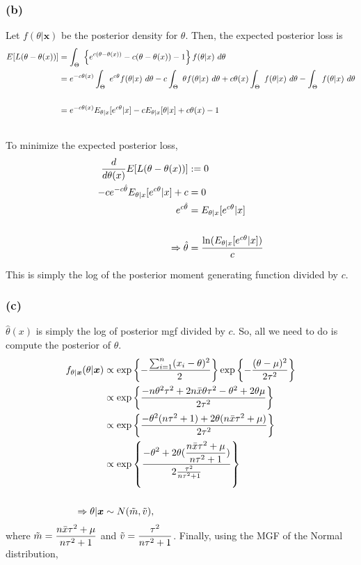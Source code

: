 \subsubsection*{(b)}
\def\mgf{E_{\theta|x}[e^{c\theta}|x]}
Let $f(\theta|\bm x)$ be the posterior density for $\theta$. Then, the expected
posterior loss is
\begin{align*}
  E[L(\mya)] &= \ds \int_\Theta~\left\{ \linex \right\}f(\theta|x)~d\theta \\
             &= \ds e^{-c\theta(x)}\int_\Theta~e^{c\theta}f(\theta|x)~d\theta - 
                    c\int_\Theta~\theta f(\theta|x)~d\theta +
                    c\theta(x)\int_\Theta~f(\theta|x)~d\theta - 
                    \int_\Theta~f(\theta|x)~d\theta \\\\
             &= e^{-c\theta(x)} \mgf -
                    cE_{\theta|x}[\theta|x] + c\theta(x) - 1\\
                    \\
\end{align*}

To minimize the expected posterior loss,
\begin{align*}
  \ds\frac{d}{d\theta(x)} E[L(\mya)] &:= 0 \\
  -c e^{-c\hat\theta} \mgf + c &= 0 \\
  e^{c\hat\theta} &= \mgf \\
  \\
  \Rightarrow \hat\theta &= \ds\frac{\ln(\mgf)}{c}
\end{align*}

\noindent
This is simply the log of the posterior moment generating function divided by $c$.

\subsubsection*{(c)}
$\hat\theta(x)$ is simply the log of posterior mgf divided by $c$. So, all we 
need to do is compute the posterior of $\theta$.
\def\denom{n\tau^2+1}
\def\postMean{\frac{n\bar{x}\tau^2+\mu}{\denom}}
\def\postVar{\frac{\tau^2}{\denom}}
\begin{align*}
  f_{\theta|\bm x}(\theta|\bm x) &\propto \exp\left\{-\frac{\sum_{i=1}^n(x_i-\theta)^2}{2}\right\}
  \exp\left\{-\frac{(\theta-\mu)^2}{2\tau^2}\right\} \\ 
  &\propto \exp \left\{ \frac{-n\theta^2\tau^2 + 2n\bar{x}\theta\tau^2 -\theta^2 +2\theta\mu}{2\tau^2} \right\} \\
  &\propto \exp \left\{ \frac{-\theta^2(n\tau^2+1)+2\theta(n\bar{x}\tau^2+\mu)}{2\tau^2} \right\}\\
  &\propto \exp\left\{ \frac{\ds-\theta^2+2\theta(\frac{n\bar{x}\tau^2+\mu}{\denom})}{2\frac{\tau^2}{\denom}} \right\}\\
  \\
\Rightarrow \theta|\bm x &\sim N(\tilde{m},\tilde{v}),
\end{align*}
where $\tilde m = \ds\postMean$ and $\tilde v = \ds\postVar$. Finally, using the
MGF of the Normal distribution,

